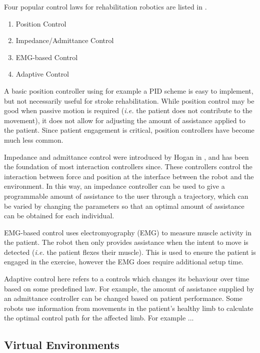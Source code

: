 \documentclass[12pt]{report}
\begin{document}
	Four popular control laws for rehabilitation robotics are listed in \cite{Meng2015}.
	
	\begin{enumerate}
		\item Position Control
		\item Impedance/Admittance Control
		\item EMG-based Control
		\item Adaptive Control 
	\end{enumerate}
	
	A basic position controller using for example a PID scheme is easy to implement, but not necessarily useful for stroke rehabilitation. While position control may be good when passive motion is required (\textit{i.e.} the patient does not contribute to the movement), it does not allow for adjusting the amount of assistance applied to the patient. Since patient engagement is critical, position controllers have become much less common. 
	
	Impedance and admittance control were introduced by Hogan in \cite{Hogan1985}, and has been the foundation of most interaction controllers since. These controllers control the interaction between force and position at the interface between the robot and the environment. In this way, an impedance controller can be used to give a programmable amount of assistance to the user through a trajectory, which can be varied by changing the parameters so that an optimal amount of assistance can be obtained for each individual. 
	
	EMG-based control uses electromyography (EMG) to measure muscle activity in the patient. The robot then only provides assistance when the intent to move is detected (\textit{i.e.} the patient flexes their muscle). This is used to ensure the patient is engaged in the exercise, however the EMG does require additional setup time. 
	
	Adaptive control here refers to a controls which changes its behaviour over time based on some predefined law. For example, the amount of assistance supplied by an admittance controller can be changed based on patient performance. Some robots use information from movements in the patient's healthy limb to calculate the optimal control path for the affected limb. For example ...
		
	\subsection{Virtual Environments}
	
\end{document}

